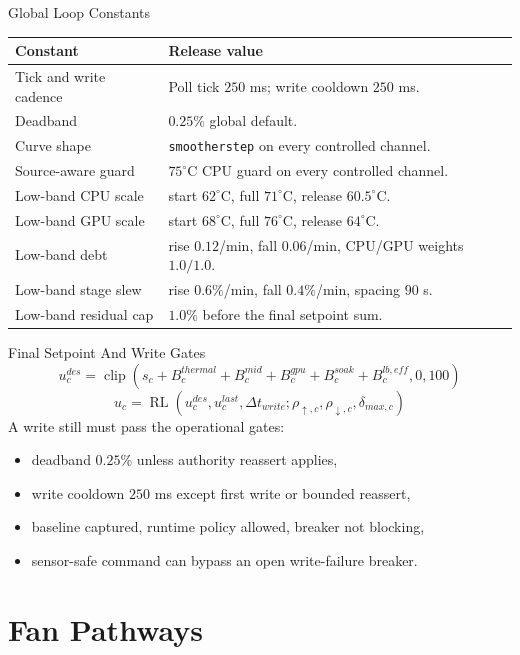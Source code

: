 \documentclass[aspectratio=169]{beamer}
\newcommand{\cfg}{\texttt}
\newcommand{\clip}{\operatorname{clip}}
\newcommand{\RL}{\operatorname{RL}}
\begin{document}
\begin{frame}{Global Loop Constants}
  \scriptsize
  \begin{tabularx}{\linewidth}{@{}lY@{}}
    \toprule
    Constant & Release value \\
    \midrule
    Tick and write cadence & Poll tick $250$ ms; write cooldown $250$ ms. \\
    Deadband & $0.25\%$ global default. \\
    Curve shape & \cfg{smootherstep} on every controlled channel. \\
    Source-aware guard & $75^\circ$C CPU guard on every controlled channel. \\
    Low-band CPU scale & start $62^\circ$C, full $71^\circ$C, release $60.5^\circ$C. \\
    Low-band GPU scale & start $68^\circ$C, full $76^\circ$C, release $64^\circ$C. \\
    Low-band debt & rise $0.12$/min, fall $0.06$/min, CPU/GPU weights $1.0/1.0$. \\
    Low-band stage slew & rise $0.6\%$/min, fall $0.4\%$/min, spacing $90$ s. \\
    Low-band residual cap & $1.0\%$ before the final setpoint sum. \\
    \bottomrule
  \end{tabularx}
\end{frame}

\begin{frame}{Final Setpoint And Write Gates}
  \[
    u^{des}_c=\clip(s_c+B^{thermal}_c+B^{mid}_c+B^{gpu}_c+
      B^{soak}_c+B^{lb,eff}_c,0,100)
  \]
  \[
    u_c=\RL(u^{des}_c,u^{last}_c,\Delta t_{write};
      \rho_{\uparrow,c},\rho_{\downarrow,c},\delta_{max,c})
  \]
  A write still must pass the operational gates:
  \begin{itemize}
    \item deadband $0.25\%$ unless authority reassert applies,
    \item write cooldown $250$ ms except first write or bounded reassert,
    \item baseline captured, runtime policy allowed, breaker not blocking,
    \item sensor-safe command can bypass an open write-failure breaker.
  \end{itemize}
\end{frame}

\section{Fan Pathways}
\end{document}
